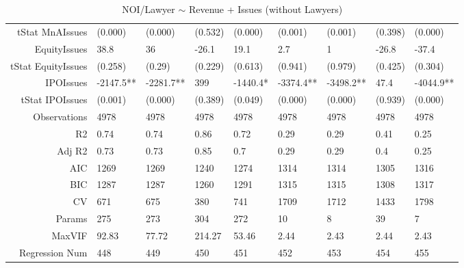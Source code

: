 \begin{table}[ht]
\begin{tabular}{rllllllll}
  tStat MnAIssues & (0.000) & (0.000) & (0.532) & (0.000) & (0.001) & (0.001) & (0.398) & (0.000) \\ 
  EquityIssues & 38.8 & 36 & -26.1 & 19.1 & 2.7 & 1 & -26.8 & -37.4 \\ 
  tStat EquityIssues & (0.258) & (0.29) & (0.229) & (0.613) & (0.941) & (0.979) & (0.425) & (0.304) \\ 
  IPOIssues & -2147.5** & -2281.7** & 399 & -1440.4* & -3374.4** & -3498.2** & 47.4 & -4044.9** \\ 
  tStat IPOIssues & (0.001) & (0.000) & (0.389) & (0.049) & (0.000) & (0.000) & (0.939) & (0.000) \\ 
  Observations & 4978 & 4978 & 4978 & 4978 & 4978 & 4978 & 4978 & 4978 \\ 
  R2 & 0.74 & 0.74 & 0.86 & 0.72 & 0.29 & 0.29 & 0.41 & 0.25 \\ 
  Adj R2 & 0.73 & 0.73 & 0.85 & 0.7 & 0.29 & 0.29 & 0.4 & 0.25 \\ 
  AIC & 1269 & 1269 & 1240 & 1274 & 1314 & 1314 & 1305 & 1316 \\ 
  BIC & 1287 & 1287 & 1260 & 1291 & 1315 & 1315 & 1308 & 1317 \\ 
  CV & 671 & 675 & 380 & 741 & 1709 & 1712 & 1433 & 1798 \\ 
  Params & 275 & 273 & 304 & 272 & 10 & 8 & 39 & 7 \\ 
  MaxVIF & 92.83 & 77.72 & 214.27 & 53.46 & 2.44 & 2.43 & 2.44 & 2.43 \\ 
  Regression Num & 448 & 449 & 450 & 451 & 452 & 453 & 454 & 455 \\ 
   \hline
\end{tabular}
\caption{NOI/Lawyer $\sim$ Revenue + Issues (without Lawyers)} 
\end{table}
